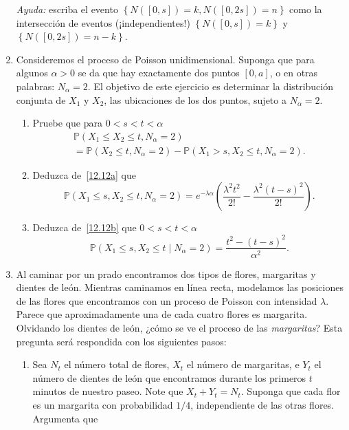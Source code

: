 \begin{enumerate}
	\emph{Ayuda:} escriba el evento $\left\{N\left(\left[0,s\right]\right)=k,N\left(\left[0,2s\right]\right)=n\right\}$ como la intersección de eventos (¡independientes!) $\left\{N\left(\left[0,s\right]\right)=k\right\}$ y $\left\{N\left(\left[0,2s\right]\right)=n-k\right\}$.
	\item Consideremos el proceso de Poisson unidimensional. Suponga que para algunos $\alpha>0$ se da que hay exactamente dos puntos $\left[0,a\right]$, o en otras palabras: $N_\alpha=2$. El objetivo de este ejercicio es determinar la distribución conjunta de $X_1$ y $X_2$, las ubicaciones de los dos puntos, sujeto a $N_\alpha=2$.
	\begin{enumerate}
		\item Pruebe que para $0<s<t<\alpha$\label{12.12a}
		\begin{multline*}
			\mathds{P}\left(X_1\le X_2\le t, N_\alpha=2\right) \\
			=\mathds{P}\left(X_2\le t, N_\alpha=2\right)-\mathds{P}\left(X_1>s,X_2\le t, N_\alpha=2\right).
		\end{multline*}
		\item Deduzca de~\ref{12.12a} que\label{12.12b}
		\begin{equation*}
			\mathds{P}\left(X_1\le s,X_2\le t,N_\alpha=2\right)=e^{-\lambda\alpha}\left(\frac{\lambda^2t^2}{2!}-\frac{\lambda^2{\left(t-s\right)}^2}{2!}\right).
		\end{equation*}
		\item Deduzca de~\ref{12.12b} que $0<s<t<\alpha$
		\begin{equation*}
			\mathds{P}\left(X_1\le s, X_2\le t\mid N_\alpha=2\right)=\frac{t^2-{\left(t-s\right)}^2}{\alpha^2}.
		\end{equation*}
	\end{enumerate}
	\item Al caminar por un prado encontramos dos tipos de flores, margaritas y dientes de león. Mientras caminamos en línea recta, modelamos las posiciones de las flores que encontramos con un proceso de Poisson con intensidad $\lambda$. Parece que aproximadamente una de cada cuatro flores es margarita. Olvidando los dientes de león, ¿cómo se ve el proceso de las \emph{margaritas}? Esta pregunta será respondida con los siguientes pasos:
	\begin{enumerate}
		\item Sea $N_t$ el número total de flores, $X_t$ el número de margaritas, e $Y_t$ el número de dientes de león que encontramos durante los primeros $t$ minutos de nuestro paseo. Note que $X_t+Y_t=N_t$. Suponga que cada flor es un margarita con probabilidad $1/4$, independiente de las otras flores. Argumenta que\label{12.13a}

\end{enumerate}
\end{enumerate}
